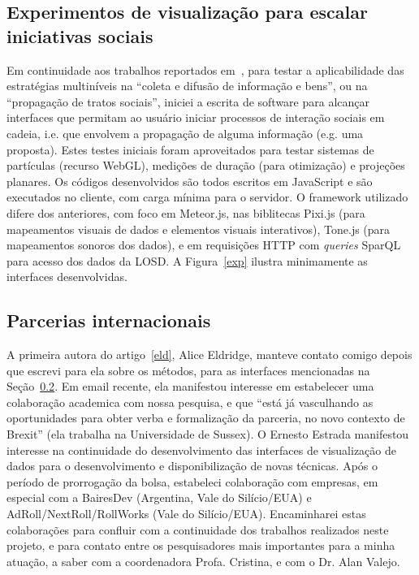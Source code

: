 \documentclass[a4paper, 11pt]{article}
\begin{document}
\subsection{Experimentos de visualização para escalar iniciativas sociais}
Em continuidade aos trabalhos reportados em~\cite{tese,virus,sfvideo},
para testar a aplicabilidade das estratégias multiníveis na ``coleta e difusão de informação e bens'',
ou na ``propagação de tratos sociais'', iniciei a escrita de software para alcançar interfaces
que permitam ao usuário iniciar processos de interação sociais em cadeia, i.e. que envolvem
a propagação de alguma informação (e.g. uma proposta).
Estes testes iniciais foram aproveitados para testar sistemas de partículas (recurso WebGL),
medições de duração (para otimização) e projeções planares.
Os códigos desenvolvidos são todos escritos em JavaScript e são executados no cliente,
com carga mínima para o servidor.
O framework utilizado difere dos anteriores, com foco em Meteor.js,
nas biblitecas Pixi.js (para mapeamentos visuais de dados e elementos visuais interativos),
Tone.js (para mapeamentos sonoros dos dados),
e em requisições HTTP com \emph{queries} SparQL para acesso dos dados da LOSD.
A Figura~\ref{exp} ilustra minimamente as interfaces desenvolvidas.

\subsection{Parcerias internacionais}
A primeira autora do artigo~\ref{eld}, Alice Eldridge,
manteve contato comigo depois que escrevi para ela sobre
os métodos, para as interfaces mencionadas na Seção~\ref{}.
Em email recente, ela manifestou interesse em
estabelecer uma colaboração academica com nossa pesquisa, e que ``está já
vasculhando as oportunidades para obter verba e formalização da parceria,
no novo contexto de Brexit'' (ela trabalha na Universidade de Sussex).
O Ernesto Estrada manifestou interesse na continuidade do desenvolvimento
das interfaces de visualização de dados para o desenvolvimento e disponibilização
de novas técnicas.
Após o período de prorrogação da bolsa, estabeleci colaboração
com empresas, em especial com a BairesDev (Argentina, Vale do Silício/EUA) e
AdRoll/NextRoll/RollWorks (Vale do Silício/EUA). 
Encaminharei estas colaborações para confluir com a continuidade dos
trabalhos realizados neste projeto, e para contato entre os pesquisadores
mais importantes para a minha atuação, a saber com a coordenadora Profa. Cristina,
e com o Dr. Alan Valejo.
\end{document}
